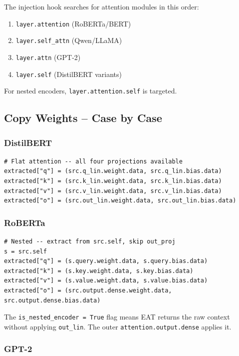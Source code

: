 The injection hook searches for attention modules in this order:

\begin{enumerate}
\item \texttt{layer.attention} (RoBERTa/BERT)
\item \texttt{layer.self\_attn} (Qwen/LLaMA)
\item \texttt{layer.attn} (GPT-2)
\item \texttt{layer.self} (DistilBERT variants)

\end{enumerate}
For nested encoders, \texttt{layer.attention.self} is targeted.

\subsection{Copy Weights -- Case by Case}

\subsubsection{DistilBERT}

\begin{lstlisting}
# Flat attention -- all four projections available
extracted["q"] = (src.q_lin.weight.data, src.q_lin.bias.data)
extracted["k"] = (src.k_lin.weight.data, src.k_lin.bias.data)
extracted["v"] = (src.v_lin.weight.data, src.v_lin.bias.data)
extracted["o"] = (src.out_lin.weight.data, src.out_lin.bias.data)
\end{lstlisting}

\subsubsection{RoBERTa}

\begin{lstlisting}
# Nested -- extract from src.self, skip out_proj
s = src.self
extracted["q"] = (s.query.weight.data, s.query.bias.data)
extracted["k"] = (s.key.weight.data, s.key.bias.data)
extracted["v"] = (s.value.weight.data, s.value.bias.data)
extracted["o"] = (src.output.dense.weight.data, src.output.dense.bias.data)
\end{lstlisting}

The \texttt{is\_nested\_encoder = True} flag means EAT returns the raw context 
without applying \texttt{out\_lin}. The outer \texttt{attention.output.dense} applies it.

\subsubsection{GPT-2}

